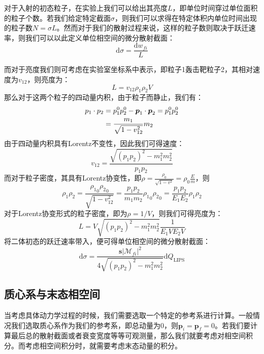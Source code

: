 对于入射的初态粒子，在实验上我们可以给出其亮度$L$，即单位时间穿过单位面积的粒子个数。若我们给定特定截面$\sigma$，则我们可以求得在特定体积内单位时间出现的粒子数$N=\sigma L$。然而对于我们的散射过程来说，这样的粒子数则取决于跃迁速率，则我们可以以此定义单位相空间的微分散射截面：
\begin{equation}
\mathrm{d}\sigma=\frac{\mathrm{d}w_{fi}}{L}
\end{equation}

而对于亮度我们则可考虑在实验室坐标系中表示，即粒子1轰击靶粒子2，其相对速度为$v_{12}$，则亮度为：
\begin{equation}
L=v_{12}\rho_1\rho_2 V
\end{equation}
那么对于这两个粒子的四动量内积，由于粒子而静止，我们有：
\begin{align}
p_1 \cdot p_2&=p_1^0 p_2^0-\boldsymbol{p}_1\cdot\boldsymbol{p}_2=p_1^0 p_2^0\notag\\
&=\frac{m_1}{\sqrt{1-v_{12}^2}}m_2
\end{align}
由于四动量内积具有Lorentz不变性，因此我们可得速度：
\begin{equation}
v_{12}=\frac{\sqrt{(p_1p_2)^2-m_1^2m_2^2}}{p_1p_2}
\end{equation}
而对于粒子密度，其具有Lorentz协变性，即$\rho=\frac{\rho_0}{\sqrt{1-v^2}}=\rho_0\frac{E}{m}$，则
\begin{equation}
\rho_1\rho_2=\frac{{\rho_1}_0{\rho_2}_0}{\sqrt{1-v_{12}^2}}=\frac{p_1p_2}{m_1m_2}{\rho_1}_0{\rho_2}_0=\frac{p_1p_2}{E_1E_2}\rho_1\rho_2
\end{equation}
对于Lorentz协变形式的粒子密度，即为$\rho=1/V$，则我们可得亮度为：
\begin{equation}
L=V\sqrt{(p_1p_2)^2-m_1^2m_2^2}\frac{1}{E_1 V E_2 V}
\end{equation}
将二体初态的跃迁速率带入，便可得单位相空间的微分散射截面：
\begin{equation}
\mathrm{d}\sigma=\frac{\textbf{s} |\mathcal{M}_{fi}|^2}{4\sqrt{(p_1p_2)^2-m_1^2m_2^2}}\mathrm{d}Q_{\text{LIPS}}
\label{eq:2bxs}
\end{equation}
\subsection{质心系与末态相空间}
当考虑具体动力学过程的时候，我们需要选取一个特定的参考系进行计算。一般情况我们选取质心系作为我们的参考系，即总动量为0，则$\boldsymbol{p}_i=\boldsymbol{p}_f=0$。若我们要计算最后总的散射截面或者衰变宽度等等可观测量，那么我们就要考虑对相空间积分。而考虑相空间积分时，就需要考虑末态动量的积分。
